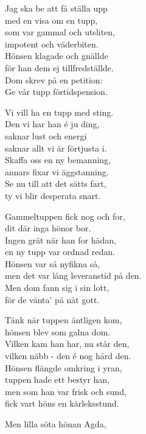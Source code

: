 \vspace{10pt}
Jag ska be att få ställa upp\\
med en visa om en tupp,\\
som var gammal och utsliten,\\
impotent och väderbiten.\\
Hönsen klagade och gnällde\\
för han dem ej tillfredställde.\\
Dom skrev på en petition:\\
Ge vår tupp förtidspension.\par
\vspace{10pt}
Vi vill ha en tupp med sting.\\
Den vi har han é ju ding,\\
saknar lust och energi\\
saknar allt vi är förtjusta i.\\
Skaffa oss en ny bemanning,\\
annars fixar vi äggstanning.\\
Se nu till att det sätts fart,\\
ty vi blir desperata snart.\par
\vspace{10pt}
Gammeltuppen fick nog och for,\\
dit där inga hönor bor.\\
Ingen grät när han for hädan,\\
en ny tupp var ordnad redan.\\
Hönsen var så nyfikna så,\\
men det var lång leveranstid på den.\\
Men dom fann sig i sin lott,\\
för de vänta' på nåt gott.\par
\vspace{10pt}
Tänk när tuppen äntligen kom,\\
hönsen blev som galna dom.\\
Vilken kam han har, nu står den,\\
vilken näbb - den é nog hård den.\\
Hönsen flängde omkring i yran,\\
tuppen hade ett bestyr han,\\
men som han var frisk och sund,\\
fick vart höns en kärleksstund.\par
\vspace{10pt}
Men lilla söta hönan Agda,\\
